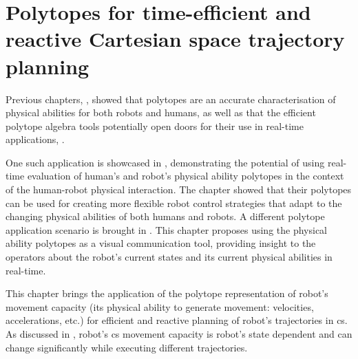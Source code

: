 
\chapter{Polytopes for time-efficient and reactive Cartesian space trajectory planning}
\label{ch:topca}


Previous chapters, , showed that polytopes are an accurate characterisation of physical abilities for both robots and humans, as well as that the efficient polytope algebra tools potentially open doors for their use in real-time applications, . 

One such application is showcased in , demonstrating the potential of using real-time evaluation of human's and robot's physical ability polytopes in the context of the human-robot physical interaction. The chapter showed that their polytopes can be used for creating more flexible robot control strategies that adapt to the changing physical abilities of both humans and robots. A different polytope application scenario is brought in . This chapter proposes using the physical ability polytopes as a visual communication tool, providing insight to the operators about the robot's current states and its current physical abilities in real-time.








This chapter brings the application of the polytope representation of robot's movement capacity (its physical ability to generate movement: velocities, accelerations, etc.) for efficient and reactive planning of robot's trajectories in \gls{cs}. 
As discussed in , robot's \gls{cs} movement capacity is robot's state dependent and can change significantly while executing different trajectories. 

